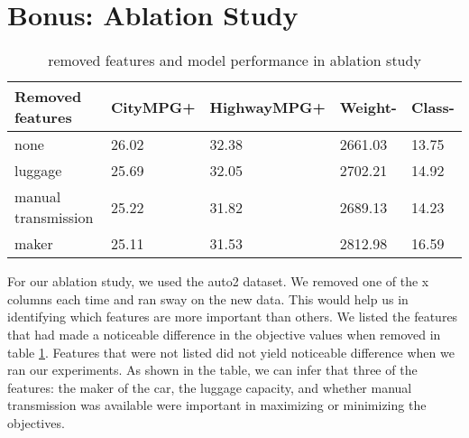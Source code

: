 \section{Bonus: Ablation Study}
\label{sec:bonus_ablation}


\begin{table}[]
  \begin{tabular}{lllll}
  Removed features    & CityMPG+ & HighwayMPG+ & Weight- & Class- \\
                      \hline
  none                & 26.02    & 32.38       & 2661.03 & 13.75  \\
  luggage             & 25.69    & 32.05       & 2702.21 & 14.92  \\
  manual transmission & 25.22    & 31.82       & 2689.13 & 14.23  \\
  maker               & 25.11    & 31.53       & 2812.98 & 16.59 
  \end{tabular}
  \caption{removed features and model performance in ablation study}
  \label{tab:ablation}
  \end{table}


  For our ablation study, we used the auto2 dataset. We removed one of
  the x columns each time and ran sway on the new data. This would help
  us in identifying which features are more important than others. We
  listed the features that had made a noticeable difference in the
  objective values when removed in table \ref{tab:ablation}. Features
  that were not listed did not yield noticeable difference when we ran
  our experiments. As shown in the table, we can infer that three of the
  features: the maker of the car, the luggage capacity, and whether
  manual transmission was available were important in maximizing or
  minimizing the objectives.